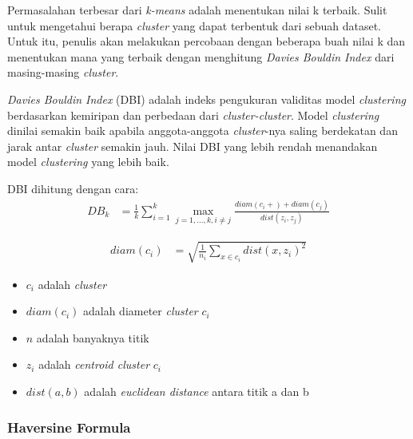 \documentclass{article}
\begin{document}
\begin{adjustwidth}{4em}{0pt}

\hspace{\parindent}Permasalahan terbesar dari \textit{k-means} adalah menentukan nilai k terbaik. Sulit untuk mengetahui berapa \textit{cluster} yang dapat terbentuk dari sebuah dataset. Untuk itu, penulis akan melakukan percobaan dengan beberapa buah nilai k dan menentukan mana yang terbaik dengan menghitung \textit{Davies Bouldin Index} dari masing-masing \textit{cluster}.

\textit{Davies Bouldin Index} (DBI) adalah indeks pengukuran validitas model \textit{clustering} berdasarkan kemiripan dan perbedaan dari \textit{cluster-cluster}. Model \textit{clustering} dinilai semakin baik apabila anggota-anggota \textit{cluster}-nya saling berdekatan dan jarak antar \textit{cluster} semakin jauh. Nilai DBI yang lebih rendah menandakan model \textit{clustering} yang lebih baik.

DBI dihitung dengan cara:
\begin{align*}
DB_{k} &= \frac{1}{k}\sum\limits_{i=1}^k
\max\limits_{j=1,...,k,i\neq j}\frac{diam(c_i +) + diam(c_j)}{dist(z_i,z_j)}
\end{align*}

\begin{align*}
diam(c_i) &= \sqrt{\frac{1}{n_i}\sum\limits_{x\in c_i}dist(x,z_i)^2}
\end{align*}

\begin{itemize}
	\setlength{\itemindent}{1cm}
	\item{$c_i$ adalah \textit{cluster}}
	\item{$diam(c_i)$ adalah diameter \textit{cluster} $c_i$}
	\item{$n$ adalah banyaknya titik}
	\item{$z_i$ adalah \textit{centroid cluster} $c_i$}
	\item{$dist(a,b)$ adalah \textit{euclidean distance} antara titik a dan b}
\end{itemize}

\end{adjustwidth}

\subsubsection{Haversine Formula}
\end{document}
